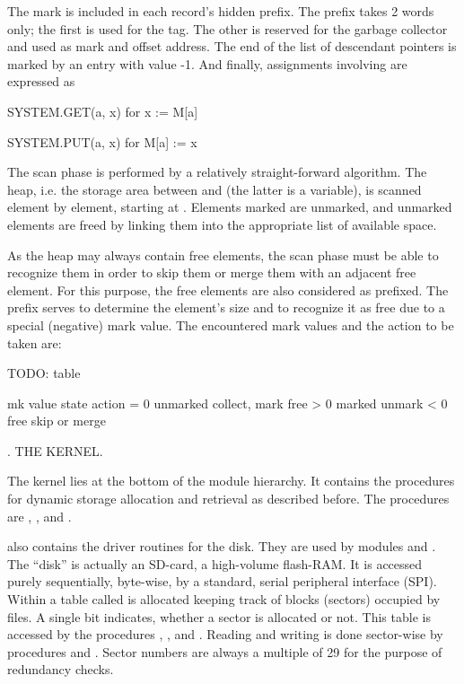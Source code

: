 \noindent The mark is included in each record's hidden prefix. The prefix takes 2 words only; the first is used for the tag. The other is reserved for the garbage collector and used as mark and offset address. The end of the list of descendant pointers is marked by an entry with value -1. And finally, assignments involving  are expressed as

SYSTEM.GET(a, x) for x := M[a]

SYSTEM.PUT(a, x) for M[a] := x

The scan phase is performed by a relatively straight-forward algorithm. The heap, i.e. the storage area between  and  (the latter is a variable), is scanned element by element, starting at . Elements marked are unmarked, and unmarked elements are freed by linking them into the appropriate list of available space.

As the heap may always contain free elements, the scan phase must be able to recognize them in order to skip them or merge them with an adjacent free element. For this purpose, the free elements are also considered as prefixed. The prefix serves to determine the element's size and to recognize it as free due to a special (negative) mark value. The encountered mark values and the action to be taken are:

TODO: table

mk value state      action
= 0      unmarked   collect, mark free
> 0      marked     unmark
< 0      free       skip or merge

. THE KERNEL.

The kernel lies at the bottom of the module hierarchy. It contains the procedures for dynamic storage allocation and retrieval as described before. The procedures are , , and .

 also contains the driver routines for the disk. They are used by modules  and . The ``disk'' is actually an SD-card, a high-volume flash-RAM. It is accessed purely sequentially, byte-wise, by a standard, serial peripheral interface (SPI). Within  a table called  is allocated keeping track of blocks (sectors) occupied by files. A single bit indicates, whether a sector is allocated or not. This table is accessed by the procedures , , and . Reading and writing is done sector-wise by procedures  and . Sector numbers are always a multiple of 29 for the purpose of redundancy checks.

